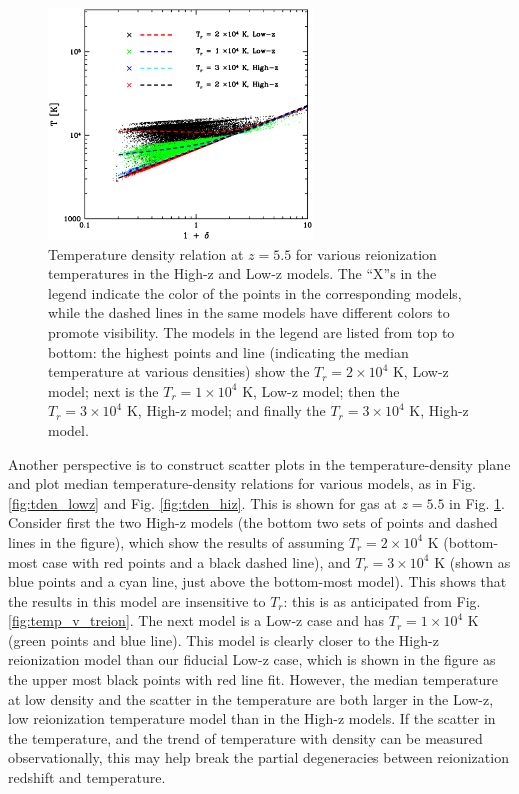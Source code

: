 \begin{figure}
\bc
\includegraphics[width=7cm]{f9.eps}
\caption{Temperature density relation at $z=5.5$ for various reionization temperatures in the High-z and Low-z models. The ``X''s in the 
legend indicate the color of the points in the corresponding models, while the dashed lines in the same models have different colors to
promote visibility. The models in the legend are listed from top to bottom: the highest points and line (indicating the median temperature
at various densities) show the $T_r = 2 \times 10^4$ K, Low-z model; next is the $T_r = 1 \times 10^4$ K, Low-z model;
then the $T_r = 3 \times 10^4$ K, High-z model; and finally the $T_r = 3 \times 10^4$ K, High-z model.
}
\label{fig:tden_v_treion}
\ec
\end{figure}

Another perspective is to construct scatter plots in the temperature-density plane and plot median temperature-density relations for various models, as in Fig. \ref{fig:tden_lowz} and Fig. \ref{fig:tden_hiz}. This is shown for gas at $z=5.5$ in Fig. \ref{fig:tden_v_treion}. Consider first the two High-z models (the bottom two sets of points and dashed lines in the figure), which show the results of assuming $T_r = 2 \times 10^4$ K (bottom-most case with red points and a black dashed line), and $T_r = 3 \times 10^4$ K (shown as blue points and a cyan line, just above the bottom-most model). This shows that the results in this model are insensitive to $T_r$: this is as anticipated from
Fig. \ref{fig:temp_v_treion}. The next model is a Low-z case and has $T_r = 1 \times 10^4$ K (green points and blue line). This
model is clearly closer to the High-z reionization model than our fiducial Low-z case, which is shown in the figure as the upper most
black points with red line fit. However, the median temperature at low density and the scatter in the temperature 
are both larger in the Low-z, low reionization
temperature model than in the High-z models. If the scatter in the temperature, and the trend of temperature with density can be measured
observationally, this may help break the partial degeneracies between reionization redshift and temperature. 




